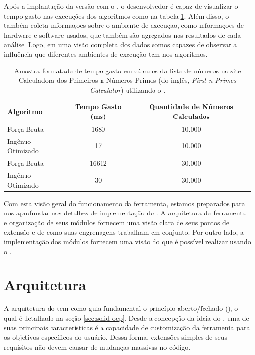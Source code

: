 \documentclass[12pt]{tcc}
\begin{document}
	Após a implantação da versão com o , o desenvolvedor é capaz de visualizar o tempo gasto nas execuções dos algoritmos como na tabela \ref{table:resultado-easyelc}.
	Além disso, o  também coleta informações sobre o ambiente de execução, como informações de hardware e software usados, que também são agregados nos resultados de cada análise.
	Logo, em uma visão completa dos dados somos capazes de observar a influência que diferentes ambientes de execução tem nos algoritmos.

	\begin{table}[!h]
		\centering
		\caption{Amostra formatada de tempo gasto em cálculos da lista de números no site Calculadora dos Primeiros n Números Primos (do inglês, \emph{First n Primes Calculator}) utilizando o .}
		\begin{tabular}{lcc}
			\hline
			Algoritmo & Tempo Gasto (ms) & Quantidade de Números Calculados \\
			\hline
			Força Bruta & 1680 & 10.000 \\
			Ingênuo Otimizado & 17 & 10.000 \\
			Força Bruta & 16612 & 30.000 \\
			Ingênuo Otimizado & 30 & 30.000 \\
			\hline
		\end{tabular}
		\label{table:resultado-easyelc}
	\end{table}

	Com esta visão geral do funcionamento da ferramenta, estamos preparados para nos aprofundar nos detalhes de implementação do .
	A arquitetura da ferramenta e organização de seus módulos fornecem uma visão clara de seus pontos de extensão e de como suas engrenagens trabalham em conjunto.
	Por outro lado, a implementação dos módulos fornecem uma visão do que é possível realizar usando o .

	\section{Arquitetura}
	\label{sec:arquitetura}

	A arquitetura do  tem como guia fundamental o princípio aberto/fechado (), o qual é detalhado na seção \ref{sec:solid-ocp}.
	Desde a concepção da ideia do , uma de suas principais características é a capacidade de customização da ferramenta para os objetivos específicos do usuário.
	Dessa forma, extensões simples de seus requisitos não devem causar de mudanças massivas no código.
\end{document}
